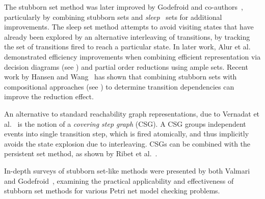 The stubborn set method was later improved by Godefroid and
co-authors~\cite{Godefroid1993,Wolper1993}, particularly by combining stubborn
sets and \emph{sleep}~\cite{Godefroid1990} sets for additional improvements.
The sleep set method attempts to avoid visiting states that have already been
explored by an alternative interleaving of transitions, by tracking the set of
transitions fired to reach a particular state. In later work, {Alur et
al.}~\cite{Alur1997} demonstrated efficiency improvements when combining
efficient representation via decision diagrams (see
) and partial order reductions using ample sets.
Recent work by {Hansen and Wang}~\cite{Hansen2011} has shown that combining
stubborn sets with compositional approaches (see
) to determine transition dependencies can
improve the reduction effect.

An alternative to standard reachability graph representations, due to {Vernadat
et al.}~\cite{Vernadat1996} is the notion of a \emph{covering step graph}
(CSG). A CSG groups independent events into single transition step, which is
fired atomically, and thus implicitly avoids the state explosion due to
interleaving. CSGs can be combined with the persistent set method, as shown by
{Ribet et al.}~\cite{Ribet2002}.

In-depth surveys of stubborn set-like methods were presented by both
Valmari~\cite{Valmari1998} and Godefroid~\cite{Godefroid1996, Godefroid1996a},
examining the practical applicability and effectiveness of stubborn set methods
for various Petri net model checking problems.
